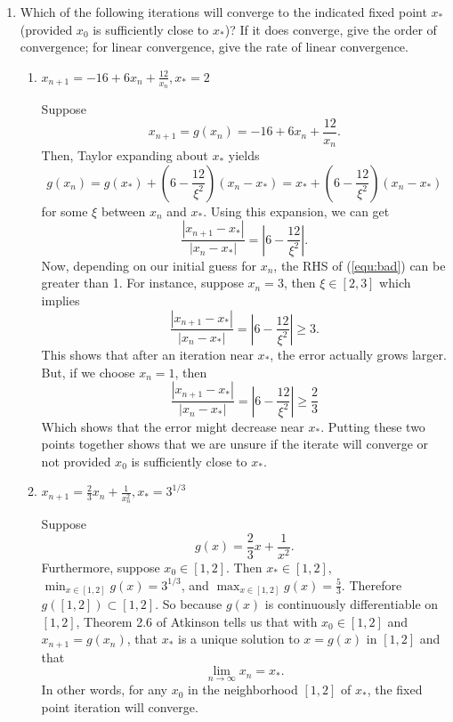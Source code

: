 \documentclass[a4paper,12pt]{article}
\newcommand{\abs}[1]{\left| #1 \right|}
\begin{document}
	\begin{enumerate}[label = \arabic*.]
		\item Which of the following iterations will converge to the indicated fixed point $ x_* $ (provided $ x_0 $ is sufficiently close to $ x_* $)? If it does converge, give the order of convergence; for linear convergence, give the rate of linear convergence.
		
		\begin{enumerate}[label = \roman*.]
			\item $ x_{n+1} = -16 + 6x_n + \frac{12}{x_n}, x_*= 2$
            
            Suppose
            \[
                x_{n+1} = g(x_n) = -16 + 6x_n + \frac{12}{x_n}.
            \]
            Then, Taylor expanding about $ x_* $ yields
            \[
                g(x_n) = g(x_*) + (6 - \frac{12}{\xi^2})(x_n - x_*) = x_* + (6 - \frac{12}{\xi^2})(x_n - x_*)
            \]
            for some $ \xi $ between $ x_n $ and $ x_* $. Using this expansion, we can get
            \begin{equation}
                \frac{\abs{x_{n + 1} - x_*}}{\abs{x_n - x_*}} =\abs{ 6 - \frac{12}{\xi^2}}. \label{equ:bad}
            \end{equation}
            Now, depending on our initial guess for $ x_n $, the RHS of (\ref{equ:bad}) can be greater than 1. For instance, suppose $ x_n = 3 $, then $ \xi \in [2, 3] $ which implies
            \[
               \frac{\abs{x_{n + 1} - x_*}}{\abs{x_n - x_*}} = \abs{ 6 - \frac{12}{\xi^2}} \geq 3.
            \]
            This shows that after an iteration near $ x_* $, the error actually grows larger. But, if we choose $ x_n = 1 $, then 
            \[
                \frac{\abs{x_{n + 1} - x_*}}{\abs{x_n - x_*}} = \abs{ 6 - \frac{12}{\xi^2}} \geq \frac{2}{3}
            \]
            Which shows that the error might decrease near $ x_* $. Putting these two points together shows that we are unsure if the iterate will converge or not provided $ x_0 $ is sufficiently close to $ x_* $.
			
			\item $ x_{n+1} = \frac{2}{3} x_n + \frac{1}{x_n^2}, x_* = 3^{1/3}$
			
			Suppose 
			\[
				g(x) = \frac{2}{3}x + \frac{1}{x^2}.
			\]
			Furthermore, suppose $ x_0 \in [1,2] $. Then $ x_* \in [1,2] $,  $ \min_{x \in [1,2]} g(x) = 3^{1/3} $, and $ \max_{x \in [1,2]}g(x) = \frac{5}{3} $. Therefore $ g([1,2]) \subset [1,2]$. So because $ g(x) $ is continuously differentiable on $ [1,2] $, Theorem 2.6 of Atkinson tells us that with $ x_0 \in [1,2] $ and $ x_{n+1} = g(x_n)$, that $ x_* $ is a unique solution to $ x = g(x) $ in $ [1,2] $ and that
			\[
				\lim_{n \to \infty} x_n = x_*.
			\]
			In other words, for any $ x_0 $ in the neighborhood $ [1,2] $ of $ x_* $, the fixed point iteration will converge.
			

\end{enumerate}
\end{enumerate}
\end{document}
